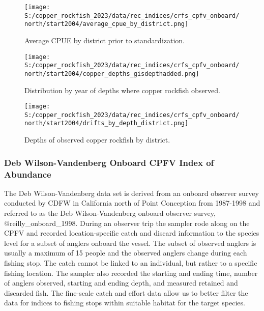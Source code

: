 \documentclass[11pt,
  letterpaper,
]{article}
\begin{document}
\begin{figure}
{\centering
\texttt{[image: S:/copper\_rockfish\_2023/data/rec\_indices/crfs\_cpfv\_onboard/north/start2004/average\_cpue\_by\_district.png]}
}
\caption{Average CPUE by district prior to standardization.\label{fig:onboard-regioncpue}}
\end{figure}

\begin{figure}
{\centering
\texttt{[image: S:/copper\_rockfish\_2023/data/rec\_indices/crfs\_cpfv\_onboard/north/start2004/copper\_depths\_gisdepthadded.png]}
}
\caption{Distribution by year of depths where copper rockfish observed.\label{fig:onboard-depths}}
\end{figure}

\begin{figure}
{\centering
\texttt{[image: S:/copper\_rockfish\_2023/data/rec\_indices/crfs\_cpfv\_onboard/north/start2004/drifts\_by\_depth\_district.png]}
}
\caption{Depths of observed copper rockfish by district.\label{fig:onboard-depths2}}
\end{figure}

\subsubsection{Deb Wilson-Vandenberg Onboard CPFV Index of Abundance}\label{dwv-cpfv-index}

The Deb Wilson-Vandenberg data set is derived from an onboard observer survey conducted by CDFW in California north of Point Conception from 1987-1998 and referred to as the Deb Wilson-Vandenberg onboard observer survey, @reilly\_onboard\_1998. During an observer trip the sampler rode along on the CPFV and recorded location-specific catch and discard information to the species level for a subset of anglers onboard the vessel. The subset of observed anglers is usually a maximum of 15 people and the observed anglers change during each fishing stop. The catch cannot be linked to an individual, but rather to a specific fishing location. The sampler also recorded the starting and ending time, number of anglers observed, starting and ending depth, and measured retained and discarded fish. The fine-scale catch and effort data allow us to better filter the data for indices to fishing stops within suitable habitat for the target species.
\end{document}
